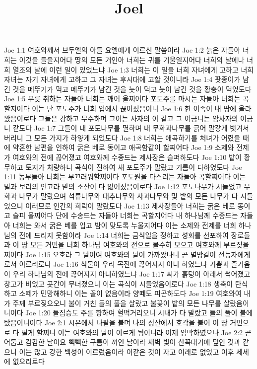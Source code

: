 

\title{Joel}

Joe 1:1  여호와께서 브두엘의 아들 요엘에게 이르신 말씀이라
Joe 1:2  늙은 자들아 너희는 이것을 들을지어다 땅의 모든 거인아 너희는 귀를 기울일지어다 너희의 날에나 너희 열조의 날에 이런 일이 있었느냐
Joe 1:3  너희는 이 일을 너희 자녀에게 고하고 너희 자녀는 자기 자녀에게 고하고 그 자녀는 후시대에 고할 것이니라
Joe 1:4  팟종이가 남긴 것을 메뚜기가 먹고 메뚜기가 남긴 것을 늣이 먹고 늣이 남긴 것을 황충이 먹었도다
Joe 1:5  무릇 취하는 자들아 너희는 깨어 울찌어다 포도주를 마시는 자들아 너희는 곡할지어다 이는 단 포도주가 너희 입에서 끊어졌음이니
Joe 1:6  한 이족이 내 땅에 올라왔음이로다 그들은 강하고 무수하며 그이는 사자의 이 같고 그 어금니는 암사자의 어금니 같도다
Joe 1:7  그들이 내 포도나무를 멸하며 내 무화과나무를 긁어 말갛게 벗겨서 버리니 그 모든 가지가 하얗게 되었도다
Joe 1:8  너희는 애곡하기를 처녀가 어렸을 때에 약혼한 남편을 인하여 굵은 베로 동이고 애곡함같이 할찌어다
Joe 1:9  소제와 전제가 여호와의 전에 끊어졌고 여호와께 수종드는 제사장은 슬퍼하도다
Joe 1:10  밭이 황무하고 토지가 처량하니 곡식이 진하여 새 포도주가 말랐고 기름이 다하였도다
Joe 1:11  농부들아 너희는 부끄러워할찌어다 포도원을 다스리는 자들아 곡할찌어다 이는 밀과 보리의 연고라 밭의 소산이 다 없어졌음이로다
Joe 1:12  포도나무가 시들었고 무화과 나무가 말랐으며 석류나무와 대추나무와 사과나무와 및 밭의 모든 나무가 다 시들었으니 이러므로 인간의 희락이 말랐도다
Joe 1:13  제사장들아 너희는 굵은 베로 동이고 슬피 울찌어다 단에 수송드는 자들아 너희는 곡할지어다 내 하나님께 수종드는 자들아 너희는 와서 굵은 베를 입고 밤이 맞도록 누울지어다 이는 소제와 전제를 너희 하나님의 전에 드리지 못함이라
Joe 1:14  너희는 금식일을 정하고 성회를 선포하여 장로들과 이 땅 모든 거민을 너희 하나님 여호와의 전으로 몰수히 모으고 여호와께 부르짖을찌어다
Joe 1:15  오호라 그 날이여 여호와의 날이 가까왔나니 곧 멸망같이 전능자에게로서 이르리로다
Joe 1:16  식물이 우리 목전에 끊어지지 아니 하였느냐 기쁨과 즐거움이 우리 하나님의 전에 끊어지지 아니하였느냐
Joe 1:17  씨가 흙덩이 아래서 썩어졌고 창고가 비었고 곳간이 무너졌으니 이는 곡식이 시들었음이로다
Joe 1:18  생축이 탄식하고 소떼가 민망해하니 이는 꼴이 없음이라 양떼도 피곤하도다
Joe 1:19  여호와여 내가 주께 부르짖으오니 불이 거친 들의 풀을 살랐고 불꽃이 밭의 모든 나무를 살랐음이니이다
Joe 1:20  들짐승도 주를 향하여 헐떡거리오니 시내가 다 말랐고 들의 풀이 불에 탔음이니이다
Joe 2:1  시온에서 나팔을 불며 나의 성산에서 호각을 불어 이 땅 거민으로 다 떨게 할찌니 이는 여호와의 날이 이르게 됨이니라 이제 임박하였으나
Joe 2:2  곧 어둡고 캄캄한 날이요 빽빽한 구름이 끼인 날이라 새벽 빛이 산꼭대기에 덮인 것과 같으니 이는 많고 강한 백성이 이르렀음이라 이같은 것이 자고 이래로 없었고 이후 세세에 없으리로다
